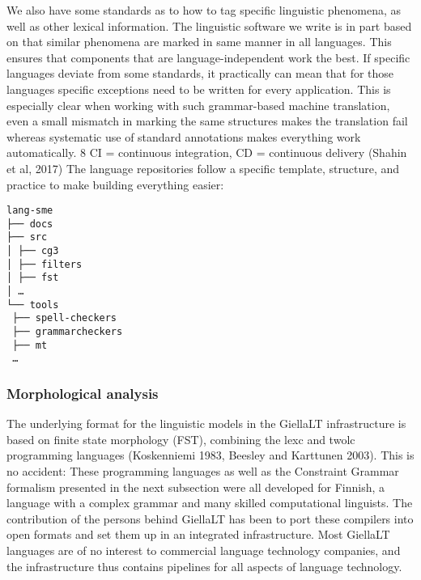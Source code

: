\documentclass[free]{flammie}
\begin{document}
We also have some standards as to how to tag specific linguistic phenomena, as well as other lexical information. The linguistic software we write is in part
based on that similar phenomena are marked in same
manner in all languages. This ensures that components that are language-independent work the best. If
specific languages deviate from some standards, it practically can mean that for those languages specific exceptions need to be written for every application. This is especially clear
when working with such grammar-based machine translation, even a small mismatch in
marking the same structures makes the translation fail whereas systematic use of standard
annotations makes everything work automatically.
8 CI = continuous integration, CD = continuous delivery (Shahin et al, 2017)
The language repositories follow a specific template, structure, and practice to make
building everything easier:
\begin{verbatim}
lang-sme
├── docs
├── src
│ ├── cg3
│ ├── filters
│ ├── fst
│ …
└── tools
 ├── spell-checkers
 ├── grammarcheckers
 ├── mt
 …
\end{verbatim}

\subsubsection{Morphological analysis}

The underlying format for the linguistic models in the GiellaLT infrastructure is based on
finite state morphology (FST), combining the lexc and twolc programming languages
(Koskenniemi 1983, Beesley and Karttunen 2003). This is no accident: These programming
languages as well as the Constraint Grammar formalism presented in the next subsection
were all developed for Finnish, a language with a complex grammar and many skilled computational linguists. The contribution of the persons behind GiellaLT has been to port these
compilers into open formats and set them up in an integrated infrastructure. Most GiellaLT
languages are of no interest to commercial language technology companies, and the infrastructure thus contains pipelines for all aspects of language technology.
\end{document}

